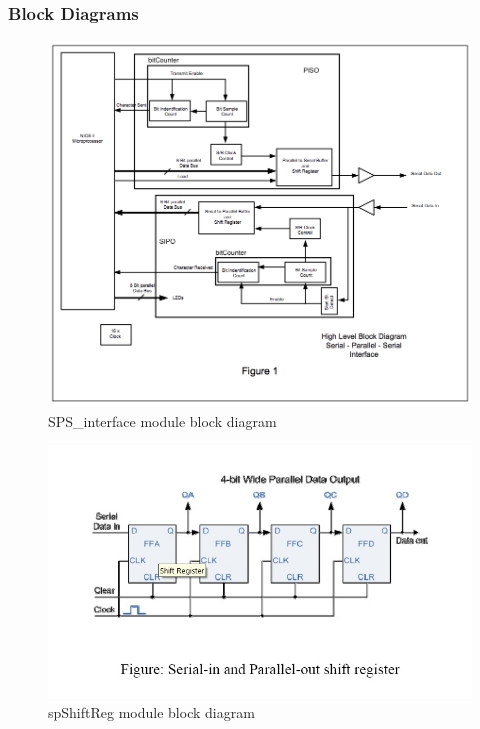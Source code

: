 \documentclass{article}
\begin{document}
    \subsubsection{Block Diagrams}
      \begin{figure}[H]
        \centering
        \includegraphics[width=0.75\linewidth]{figures/block_diagrams/SPS_interface_blockdiagram.png}
        \caption{SPS\_interface module block diagram}
        \label{fig:SPS_interface_blockdiagram}
      \end{figure}

      \begin{figure}[H]
        \centering
        \includegraphics[width=0.75\linewidth]{figures/block_diagrams/spShiftReg_blockdiagram.jpg}
        \caption{spShiftReg module block diagram}
        \label{fig:spShiftReg_blockdiagram}
      \end{figure}
\end{document}
